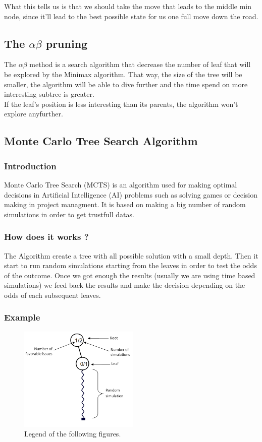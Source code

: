\noindent
What this tells us is that we should take the move that leads to the middle min node, since it'll lead to the best possible state for us one full move down the road. 

\subsection{The \ensuremath{\alpha\beta} pruning} %
The \ensuremath{\alpha\beta} method is a search algorithm that decrease the number of leaf that will be explored by the Minimax algorithm. That way, the size of the tree will be smaller, the algorithm will be able to dive further and the time spend on more interesting subtree is greater.\\
If the leaf's position is less interesting than its parents, the algorithm won't explore anyfurther.

\subsection{Monte Carlo Tree Search Algorithm}
\subsubsection{Introduction}
Monte Carlo Tree Search (MCTS) is an algorithm used for making optimal decisions in Artificial Intelligence (AI) problems such as solving games or decision making in project managment. It is based on making a big number of random simulations in order to get trustfull datas.
\subsubsection{How does it works ?}
The Algorithm create a tree with all possible solution with a small depth.
Then it start to run random simulations starting from the leaves in order to test the odds of the outcome.
Once we got enough the results (usually we are using time based simulations) we feed back the results and make the decision depending on the odds of each subsequent leaves.
\subsubsection{Example}
\label{sec:example}
\begin{figure}[H]
\centering
\includegraphics[height=5cm]{1_Presentation/1.2_Algorithm_MCTS_Benoit/img/schema.png}
\caption{\label{fig:schema}Legend of the following figures.}
\end{figure}

